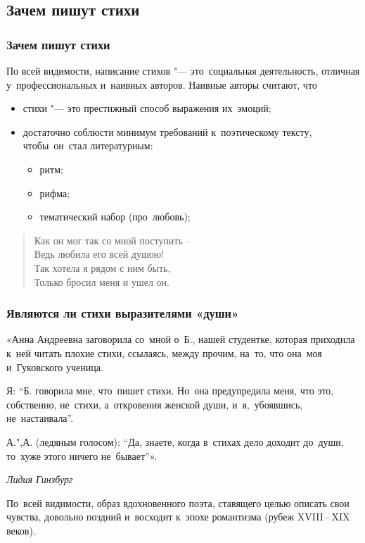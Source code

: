 \documentclass{beamer}
\begin{document}
\subsection{Зачем пишут стихи}\label{sec:why} %


\begin{frame}
\frametitle{Зачем пишут стихи}
По всей видимости, написание стихов "--- это~социальная деятельность, отличная у~профессиональных и~наивных авторов.
Наивные авторы считают, что
\begin{itemize}
\item стихи "--- это престижный способ выражения их~эмоций;
\item достаточно соблюсти минимум требований к~поэтическому тексту, чтобы~он~стал литературным:
\begin{itemize}
\item ритм;
\item рифма;
\item тематический набор (про~любовь);
\end{itemize}
\end{itemize}

\begin{verse}
Как он мог так со мной поступить –\\
Ведь любила его всей душою!\\
Так хотела я рядом с ним быть,\\
Только бросил меня и ушел он.\\
\end{verse}

\end{frame}


\begin{frame}
\frametitle{Являются ли стихи выразителями «души»}
«Анна Андреевна заговорила со~мной о~Б., нашей студентке, которая приходила к~ней читать плохие стихи, ссылаясь, между прочим, на~то, что она~моя и~Гуковского ученица.

Я: “Б. говорила мне, что~пишет стихи. Но~она предупредила меня, что это, собственно, не~стихи, а~откровения женской души, и~я,~убоявшись, не~настаивала”.

А.",А. (ледяным голосом): “Да, знаете, когда в~стихах дело доходит до~души, то~хуже этого ничего не~бывает”».

\textit{Лидия Гинзбург}

\begin{flushleft}
По~всей видимости, образ вдохновенного поэта, ставящего целью описать свои чувства, довольно поздний и~восходит к~эпохе романтизма (рубеж XVIII\,--\,XIX веков).
\end{flushleft}


\end{frame}
\end{document}

